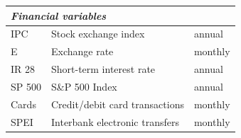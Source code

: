 \documentclass[12pt]{article}
\begin{document}
\begin{table}
\begin{tabular}{lll}
\hline
\multicolumn{3}{l}{\textit{Financial variables}} \\
\hline
IPC              & Stock exchange index           & annual  \\
E                & Exchange rate                  & monthly \\
IR 28            & Short-term interest rate       & annual  \\
SP 500           & S\&P 500 Index                 & annual  \\
Cards            & Credit/debit card transactions & monthly \\
SPEI             & Interbank electronic transfers & monthly \\
\end{tabular}

\end{table}
\end{document}
